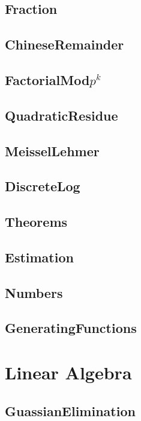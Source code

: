 	\subsection{Fraction}
	
	\subsection{ChineseRemainder}
	
	\subsection{FactorialMod$p^k$}
	
	\subsection{QuadraticResidue}
	
	\subsection{MeisselLehmer}
	
	\subsection{DiscreteLog}
	
	\subsection{Theorems}
	
	\subsection{Estimation}
	
	\subsection{Numbers}
	
	\subsection{GeneratingFunctions}
	
\section{Linear Algebra}
	\subsection{GuassianElimination}
	
